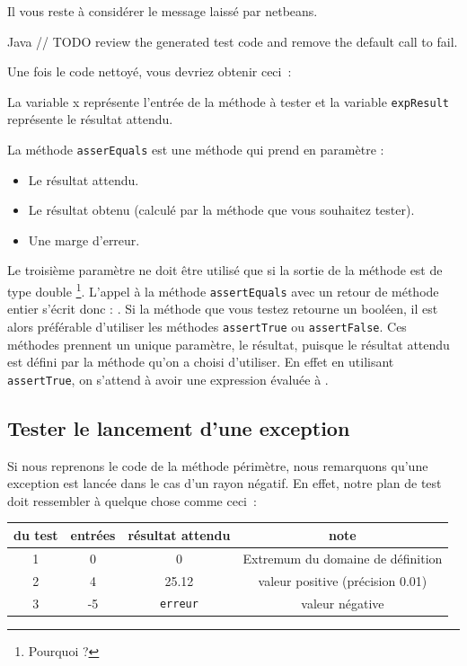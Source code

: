 \documentclass[a4paper,11pt]{style-esi/td}
\begin{document}
	Il vous reste à considérer le message laissé par netbeans.
	\begin{Code}{Java}
		// TODO review the generated test code and remove the default call to fail.
	\end{Code}

	Une fois le code nettoyé, vous devriez obtenir ceci~:

	La variable x représente l’entrée de la méthode à tester et la variable \texttt{expResult} représente le résultat attendu.

	La méthode \texttt{asserEquals} est une méthode qui prend en paramètre :
	\begin{itemize}
		\item Le résultat attendu.
		\item Le résultat obtenu (calculé par la méthode que vous souhaitez tester).
		\item Une marge d’erreur.
	\end{itemize}

	Le troisième paramètre ne doit être utilisé que si la sortie de la méthode est de type double \footnote{Pourquoi ?}.
	L’appel à la méthode \texttt{assertEquals} avec un retour de méthode entier s’écrit donc :
	.
	Si la méthode que vous testez retourne un booléen, il est alors préférable d’utiliser les méthodes \texttt{assertTrue} ou \texttt{assertFalse}. Ces méthodes prennent un unique paramètre, le résultat, puisque le résultat attendu est défini par la méthode qu'on a choisi d'utiliser. En effet en utilisant \texttt{assertTrue}, on s’attend à avoir une expression évaluée à .

	\subsection{Tester le lancement d'une exception}
	Si nous reprenons le code de la méthode périmètre, nous remarquons qu'une exception est lancée dans le cas d'un rayon négatif. En effet, notre plan de test doit ressembler à quelque chose comme ceci~:

	\begin{center}
		\begin{tabular}{|c|c|c|c|}
			\hline
			\no du test & entrées & résultat attendu & note \\
			\hline
			1 & 0 & 0 & Extremum du domaine de définition \\
			\hline
			2 & 4 & 25.12 & valeur positive (précision 0.01) \\
			\hline
			3 & -5 & \texttt{erreur} & valeur négative \\
			\hline
		\end{tabular}
	\end{center}
\end{document}
